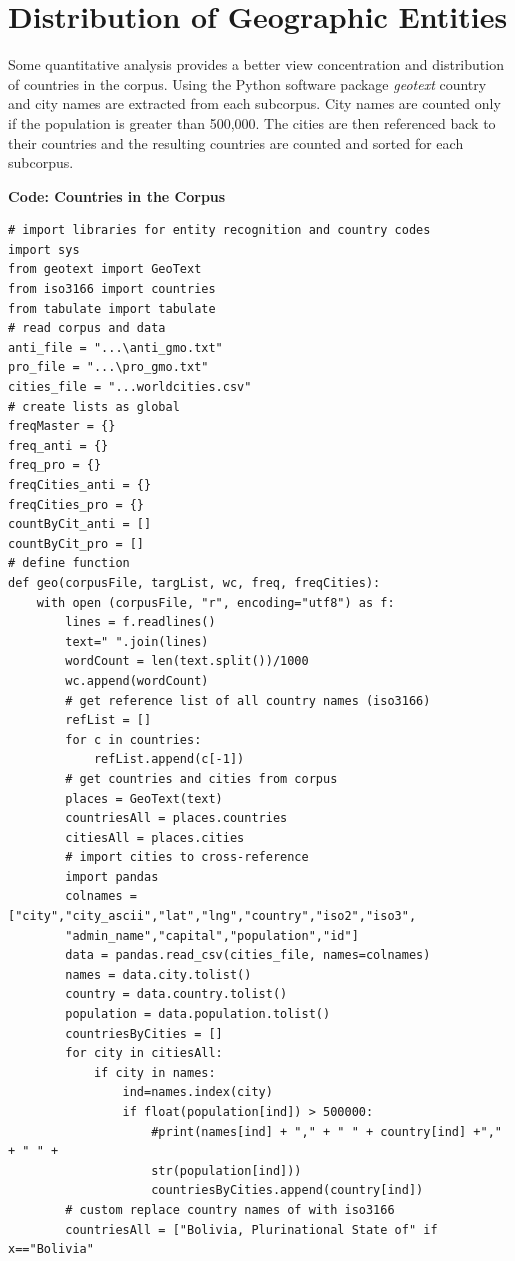 \section{Distribution of Geographic Entities}
Some quantitative analysis provides a better view concentration and distribution of countries in the corpus. Using the Python software package \textit{geotext} country and city names are extracted from each subcorpus. City names are counted only if the population is greater than 500,000. The cities are then referenced back to their countries and the resulting countries are counted and sorted for each subcorpus.

\textbf{Code: Countries in the Corpus}

\begin{lstlisting}
# import libraries for entity recognition and country codes
import sys
from geotext import GeoText
from iso3166 import countries
from tabulate import tabulate
# read corpus and data
anti_file = "...\anti_gmo.txt"
pro_file = "...\pro_gmo.txt"
cities_file = "...worldcities.csv"
# create lists as global 
freqMaster = {}
freq_anti = {} 
freq_pro = {} 
freqCities_anti = {}
freqCities_pro = {}
countByCit_anti = []
countByCit_pro = []
# define function
def geo(corpusFile, targList, wc, freq, freqCities):
    with open (corpusFile, "r", encoding="utf8") as f:
        lines = f.readlines()
        text=" ".join(lines)
        wordCount = len(text.split())/1000
        wc.append(wordCount)
        # get reference list of all country names (iso3166)
        refList = []
        for c in countries:
            refList.append(c[-1])
        # get countries and cities from corpus 
        places = GeoText(text)
        countriesAll = places.countries
        citiesAll = places.cities
        # import cities to cross-reference
        import pandas
        colnames = ["city","city_ascii","lat","lng","country","iso2","iso3",
        "admin_name","capital","population","id"]
        data = pandas.read_csv(cities_file, names=colnames)
        names = data.city.tolist()
        country = data.country.tolist()
        population = data.population.tolist()
        countriesByCities = []
        for city in citiesAll:
            if city in names:
                ind=names.index(city)
                if float(population[ind]) > 500000:
                    #print(names[ind] + "," + " " + country[ind] +"," + " " +
                    str(population[ind]))
                    countriesByCities.append(country[ind])
        # custom replace country names of with iso3166
        countriesAll = ["Bolivia, Plurinational State of" if x=="Bolivia" 

\end{lstlisting}
